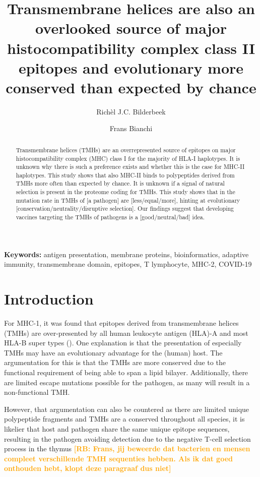 \documentclass{article}
\title{
  Transmembrane helices are also 
  an overlooked source of major histocompatibility complex class II epitopes
  and evolutionary more conserved than expected by chance
}
\author[1]{Rich\`el J.C. Bilderbeek}
\author[2]{Frans Bianchi}
\affil[1]{Groningen Institute for Evolutionary Life Sciences, University of 
Groningen, Groningen, The Netherlands}
\affil[2]{Frans' Institute, University of Groningen, Groningen, The Netherlands}
\newcommand{\richel}[1]{\textcolor{orange}{\textbf{[RB: #1]}}}
\begin{document}
\maketitle

\begin{abstract}

Transmembrane helices (TMHs) are an overrepresented source of epitopes on major 
histocompatibility complex (MHC) class I for the majority of HLA-I haplotypes. 
It is unknown why there is such a preference exists and 
whether this is the case for MHC-II haplotypes. 
This study shows that also MHC-II binds to polypeptides derived from TMHs 
more often than expected by chance. It is unknown if a signal of
natural selection is present in the proteome coding for TMHs.
This study shows that in the mutation rate in TMHs of [a pathogen] 
are [less/equal/more], hinting at 
evolutionary [conservation/neutrality/disruptive selection].
Our findings suggest that developing vaccines targeting the TMHs of
pathogens is a [good/neutral/bad] idea.

\end{abstract}

{\bf Keywords:} antigen presentation, membrane proteins, bioinformatics, 
adaptive immunity, transmembrane domain, epitopes, T lymphocyte, MHC-2,
COVID-19

\section{Introduction}

For MHC-1, it was found that epitopes derived from transmembrane helices (TMHs)
are over-presented by all human leukocyte antigen (HLA)-A and 
most HLA-B super types (\cite{bianchi2017}). 
One explanation is that the 
presentation of especially TMHs may have an evolutionary advantage for 
the (human) host. The argumentation for this is that the TMHs are more 
conserved due to the functional requirement of being able to span a lipid 
bilayer. Additionally, there are limited escape mutations possible for the 
pathogen, as many will result in a non-functional TMH.

However, that argumentation can also be countered as there are limited unique 
polypeptide fragments and TMHs are a conserved throughout all species, it is 
likelier that host and pathogen share the same unique epitope sequences, 
resulting in the pathogen avoiding detection due to the negative T-cell 
selection process in the thymus \richel{Frans, jij beweerde dat bacterien
en mensen compleet verschillende TMH sequenties hebben. Als ik dat goed
onthouden hebt, klopt deze paragraaf dus niet}
\end{document}
